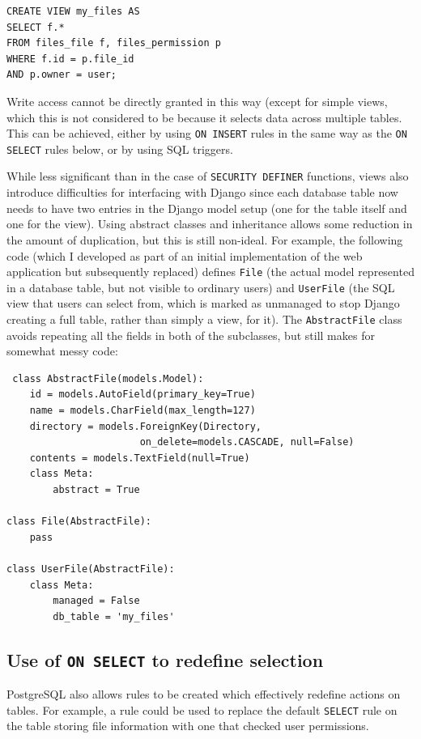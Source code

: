 \documentclass[12pt]{report}
\begin{document}
\begin{verbatim}
CREATE VIEW my_files AS
SELECT f.*
FROM files_file f, files_permission p
WHERE f.id = p.file_id
AND p.owner = user;
\end{verbatim}

Write access cannot be directly granted in this way (except for simple views, which this is not considered to be because it selects data across multiple tables. This can be achieved, either by using \texttt{ON INSERT} rules in the same way as the \texttt{ON SELECT} rules below, or by using SQL triggers\cite{postgres-CREATE_VIEW}.

While less significant than in the case of \texttt{SECURITY DEFINER} functions, views also introduce difficulties for interfacing with Django since each database table now needs to have two entries in the Django model setup (one for the table itself and one for the view). Using abstract classes and inheritance allows some reduction in the amount of duplication, but this is still non-ideal. For example, the following code (which I developed as part of an initial implementation of the web application but subsequently replaced) defines \texttt{File} (the actual model represented in a database table, but not visible to ordinary users) and \texttt{UserFile} (the SQL view that users can select from, which is marked as unmanaged to stop Django creating a full table, rather than simply a view, for it). The \texttt{AbstractFile} class avoids repeating all the fields in both of the subclasses, but still makes for somewhat messy code:

\begin{verbatim}
 class AbstractFile(models.Model):
    id = models.AutoField(primary_key=True)
    name = models.CharField(max_length=127)
    directory = models.ForeignKey(Directory,
                       on_delete=models.CASCADE, null=False)
    contents = models.TextField(null=True)
    class Meta:
        abstract = True

class File(AbstractFile):
    pass

class UserFile(AbstractFile):
    class Meta:
        managed = False
        db_table = 'my_files'
\end{verbatim}

\subsection{Use of \texttt{ON SELECT} to redefine selection}
PostgreSQL also allows rules to be created which effectively redefine actions on tables. For example, a rule could be used to replace the default \texttt{SELECT} rule on the table storing file information with one that checked user permissions.
\end{document}
